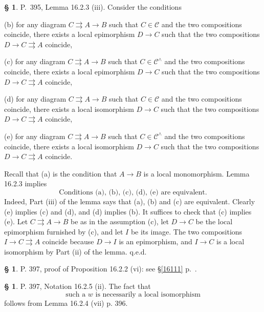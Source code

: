 \documentclass[12pt]{article}%
\theoremstyle{remark}
\theoremstyle{definition}
\newtheorem{s}[thm]{\S}%
\newcommand{\C}{\mathcal C}
\newcommand{\parar}{\rightrightarrows}
\begin{document}
\begin{s}\label{s1623}
P.~395, Lemma 16.2.3 (iii). Consider the conditions

\noindent(b) for any diagram $C\parar A\to B$ such that $C\in\C$ and the two compositions coincide, there exists a local epimorphism $D\to C$ such that the two compositions $D\to C\parar A$ coincide,

\noindent(c) for any diagram $C\parar A\to B$ such that $C\in\C^\wedge$ and the two compositions coincide, there exists a local epimorphism $D\to C$ such that the two compositions $D\to C\parar A$ coincide,

\noindent(d) for any diagram $C\parar A\to B$ such that $C\in\C$ and the two compositions coincide, there exists a local isomorphism $D\to C$ such that the two compositions $D\to C\parar A$ coincide,

\noindent(e) for any diagram $C\parar A\to B$ such that $C\in\C^\wedge$ and the two compositions coincide, there exists a local isomorphism $D\to C$ such that the two compositions $D\to C\parar A$ coincide.

Recall that (a) is the condition that $A\to B$ is a local monomorphism. Lemma 16.2.3 implies 
%
\begin{equation}\label{e1623}
\text{Conditions (a), (b), (c), (d), (e) are equivalent.}
\end{equation}
%
Indeed, Part (iii) of the lemma says that (a), (b) and (c) are equivalent. Clearly (e) implies (c) and (d), and (d) implies (b). It suffices to check that (c) implies (e). Let $C\parar A\to B$ be as in the assumption (c), let $D\to C$ be the local epimorphism furnished by (c), and let $I$ be its image. The two compositions $I\to C\parar A$ coincide because $D\to I$ is an epimorphism, and $I\to C$ is a local isomorphism by Part (ii) of the lemma. q.e.d.
\end{s}

%

\begin{s}
P. 397, proof of Proposition 16.2.2 (vi): see \S\ref{16111} p.~\pageref{16111}.
\end{s}

%

\begin{s} 
P. 397, Notation 16.2.5 (ii). The fact that 
\begin{equation}\label{1625}
\text{such a $w$ is necessarily a local isomorphism}
\end{equation}
follows from Lemma 16.2.4 (vii) p. 396.
\end{s}
\end{document}
